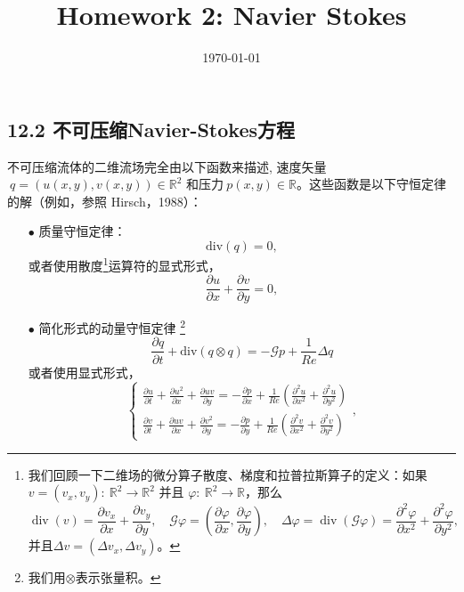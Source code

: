 \documentclass[12pt, a4paper, oneside]{ctexart}
\title{\textbf{Homework 2: Navier Stokes}}
\date{\today}
\begin{document}
\maketitle
{\raggedright\subsection*{12.2 不可压缩Navier-Stokes方程}}
{\raggedright
不可压缩流体的二维流场完全由以下函数来描述, 速度矢量 {$ \ q=(u(x, y), v(x, y)) \in \mathbb{R}^2$} 
和压力{$\ p(x,y)\in \mathbb{R}$}。这些函数是以下守恒定律的解（例如，参照 Hirsch，1988）：}\cite{book1}
\begin{itemize}
    \item[$\bullet$] 质量守恒定律：
    \begin{equation}
        \mathrm{div}(q)=0, \label{E1}
    \end{equation}
    或者使用散度\footnote{我们回顾一下二维场的微分算子散度、梯度和拉普拉斯算子的定义：如果$v=(v_x,v_y):\ \mathbb{R}^2\rightarrow \mathbb{R}^2$ 并且 $\varphi:
    \ \mathbb{R}^2\rightarrow \mathbb{R}$，那么$$
    \operatorname{div}(v)=\frac{\partial v_x}{\partial x}+\frac{\partial v_y}{\partial y}, \quad \mathcal{G} \varphi=\left(\frac{\partial \varphi}{\partial x}, \frac{\partial \varphi}{\partial y}\right), \quad \Delta \varphi=\operatorname{div}(\mathcal{G} \varphi)=\frac{\partial^2 \varphi}{\partial x^2}+\frac{\partial^2 \varphi}{\partial y^2},
    $$
    并且$\Delta v= (\Delta v_x,\Delta v_y)$。
    }运算符的显式形式，
    \begin{equation}
        \frac{\partial u}{\partial x}+\frac{\partial v}{\partial y}=0,\label{E2} 
    \end{equation}
    
    \item[$\bullet$] 简化形式的动量守恒定律 \footnote{我们用$\otimes$表示张量积。}
    \begin{equation}
        \frac{\partial q}{\partial t}+\mathrm{div}(q \otimes q)=-\mathcal{G} p+\frac{1}{R e} \Delta q \label{E3}
    \end{equation}
    或者使用显式形式，
    \begin{equation}
        \left\{\begin{array}{l}
            \frac{\partial u}{\partial t}+\frac{\partial u^2}{\partial x}+\frac{\partial u v}{\partial y}=-\frac{\partial p}{\partial x}+\frac{1}{R e}\left(\frac{\partial^2 u}{\partial x^2}+\frac{\partial^2 u}{\partial y^2}\right) \\
            \frac{\partial v}{\partial t}+\frac{\partial u v}{\partial x}+\frac{\partial v^2}{\partial y}=-\frac{\partial p}{\partial y}+\frac{1}{R e}\left(\frac{\partial^2 v}{\partial x^2}+\frac{\partial^2 v}{\partial y^2}\right)
            \end{array}\right.,\label{E4}
    \end{equation}
    \end{itemize}
\end{document}
